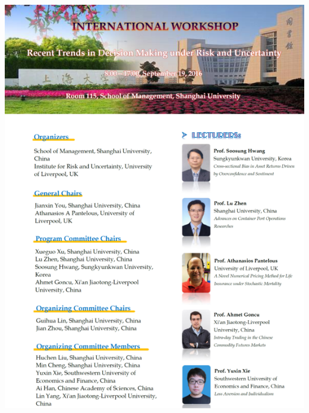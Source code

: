 \documentclass[11pt]{article}%
\begin{document}
\begin{minipage}{1.\textwidth}
\begin{multicols}{2}
\includegraphics[width=1\linewidth]{training/PictureThanasi1_1.png}




\end{multicols}
\end{minipage}
\end{document}
